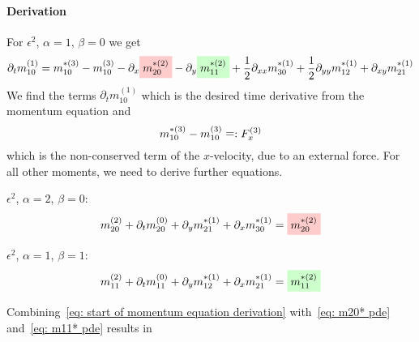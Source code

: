 \documentclass{article}
\begin{document}
\paragraph{Derivation}
\label{par:Derivation of momentum equation}

For $\epsilon^2$, $\alpha=1$, $\beta=0$ we get
\begin{equation}
  \label{eq: start of momentum equation derivation}
  \begin{aligned}
     \partial_t m_{10}^{(1)} =
    m_{10}^{*(3)} - m_{10}^{(3)}
    - \partial_x \highlight{m_{20}^{*(2)}} -
    \partial_y \highlight[green]{m_{11}^{*(2)}} + \frac{1}{2}\partial_{xx} m_{30}^{*(1)} + \frac{1}{2} \partial_{yy} m_{12}^{*(1)} + \partial_{xy} m_{21}^{*(1)}
  \end{aligned}
\end{equation}
We find the terms $\partial_t m_{10}^{(1)} $ which is the desired time derivative from the momentum equation and
\begin{equation}
  m_{10}^{*(3)} - m_{10}^{(3)}\mathrel{\mathop=}: F_x^{(3)}
\end{equation}
 which is the non-conserved term of the $x$-velocity, due to an external force. For all other moments, we need to derive further equations.

$\epsilon^2$, $\alpha=2$, $\beta=0$:
\begin{equation}
  \label{eq: m20* pde}
  m_{20}^{(2)} + \partial_t m_{20}^{(0)} + \partial_y m_{21}^{*(1)} + \partial_x m_{30}^{*(1)} = \highlight{m_{20}^{*(2)}}
\end{equation}

$\epsilon^2$, $\alpha=1$, $\beta=1$:
\begin{equation}
  \label{eq: m11* pde}
  m_{11}^{(2)} + \partial_t m_{11}^{(0)} + \partial_y m_{12}^{*(1)} + \partial_x m_{21}^{*(1)} = \highlight[green]{m_{11}^{*(2)}}
\end{equation}

Combining~\eqref{eq: start of momentum equation derivation} with~\eqref{eq: m20* pde} and~\eqref{eq: m11* pde} results in
\end{document}
